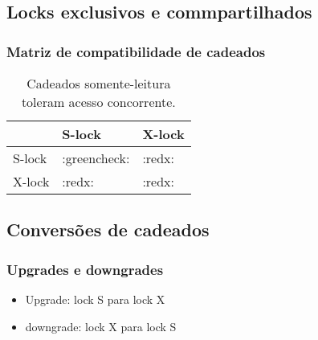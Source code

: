 \documentclass{beamer}
\begin{document}


\subsection{Locks exclusivos e commpartilhados}
\begin{frame}
    \frametitle{Matriz de compatibilidade de cadeados}
    \begin{table}
    \begin{tabular}{l l l}
    \toprule
    \textbf{} & \textbf{S-lock} & \textbf{X-lock}\\
    \midrule
    S-lock & :greencheck: & :redx: \\
    X-lock & :redx: & :redx: \\
    \bottomrule
    \end{tabular}
    \caption{Cadeados somente-leitura toleram acesso concorrente.}
    \end{table}
\end{frame}


\subsection{Conversões de cadeados} %

\begin{frame}
\frametitle{Upgrades e downgrades}
\begin{itemize}
    \item Upgrade: lock S para lock X
    \item downgrade: lock X para lock S
\end{itemize}
\end{frame}

\end{document}
